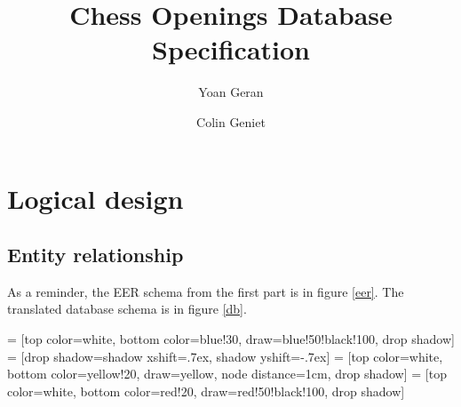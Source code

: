 \documentclass{article}
\begin{document}
\title{Chess Openings Database Specification}
\author{Yoan Geran \and Colin Geniet}
\maketitle

\tableofcontents

\section{Logical design}
\subsection{Entity relationship}
As a reminder, the EER schema from the first part is in figure \ref{eer}.
The translated database schema is in figure \ref{db}.


 = [top color=white, bottom color=blue!30, 
                            draw=blue!50!black!100, drop shadow]
 = [drop shadow={shadow xshift=.7ex, 
                                 shadow yshift=-.7ex}]
 = [top color=white, bottom color=yellow!20, 
                               draw=yellow, node distance=1cm, drop shadow]
 = [top color=white, bottom color=red!20, 
                                  draw=red!50!black!100, drop shadow]
\end{document}
